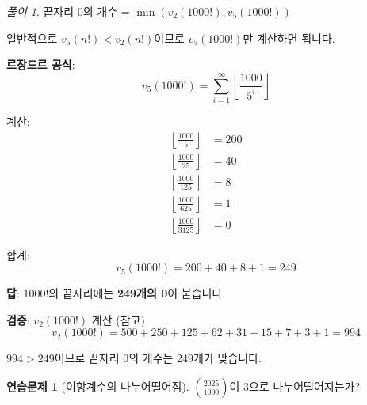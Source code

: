 \documentclass[11pt,a4paper]{article}
\theoremstyle{definition}
\newtheorem{exercise}{연습문제}[section]
\theoremstyle{remark}
\newtheorem*{solution}{풀이}
\begin{document}
\begin{solution}

끝자리 0의 개수 = $\min(v_2(1000!), v_5(1000!))$

일반적으로 $v_5(n!) < v_2(n!)$이므로 $v_5(1000!)$만 계산하면 됩니다.

\textbf{르장드르 공식}:
\[v_5(1000!) = \sum_{i=1}^{\infty} \left\lfloor \frac{1000}{5^i} \right\rfloor\]

계산:
\begin{align*}
\left\lfloor \frac{1000}{5} \right\rfloor &= 200 \\
\left\lfloor \frac{1000}{25} \right\rfloor &= 40 \\
\left\lfloor \frac{1000}{125} \right\rfloor &= 8 \\
\left\lfloor \frac{1000}{625} \right\rfloor &= 1 \\
\left\lfloor \frac{1000}{3125} \right\rfloor &= 0
\end{align*}

합계:
\[v_5(1000!) = 200 + 40 + 8 + 1 = 249\]

\textbf{답}: $1000!$의 끝자리에는 \textbf{249개의 0}이 붙습니다.

\textbf{검증}: $v_2(1000!)$ 계산 (참고)
\[v_2(1000!) = 500 + 250 + 125 + 62 + 31 + 15 + 7 + 3 + 1 = 994\]

$994 > 249$이므로 끝자리 0의 개수는 249개가 맞습니다. \checkmark
\end{solution}

\begin{exercise}[이항계수의 나누어떨어짐]
$\binom{2025}{1000}$이 3으로 나누어떨어지는가?
\end{exercise}
\end{document}
